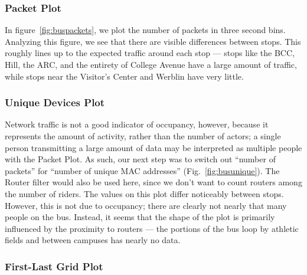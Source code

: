 \subsubsection*{Packet Plot}

In figure~\ref{fig:buspackets}, we plot the number of packets in three second bins.
Analyzing this figure, we see that there are visible differences between stops.
This roughly lines up to the expected traffic around each stop --- stops like the BCC, Hill, the ARC, and the entirety of College Avenue have a large amount of traffic, while stops near the Visitor's Center and Werblin have very little.

\subsubsection*{Unique Devices Plot}

Network traffic is not a good indicator of occupancy, however, because it represents the amount of activity, rather than the number of actors; a single person transmitting a large amount of data may be interpreted as multiple people with the Packet Plot.
As such, our next step was to switch out ``number of packets'' for ``number of unique MAC addresses'' (Fig.~\ref{fig:busunique}).
The Router filter would also be used here, since we don't want to count routers among the number of riders.
The values on this plot differ noticeably between stops.
However, this is not due to occupancy; there are clearly not nearly that many people on the bus.
Instead, it seems that the shape of the plot is primarily influenced by the proximity to routers --- the portions of the bus loop by athletic fields and between campuses has nearly no data.

\subsubsection*{First-Last Grid Plot}

